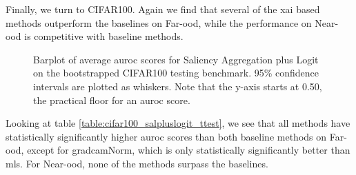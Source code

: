 \documentclass[UKenglish]{uiomasterthesis} %
\theoremstyle{definition}
\begin{document}
Finally, we turn to CIFAR100. Again we find that several of the \ac{xai} based methods outperform the baselines on Far-\ac{ood}, while the performance on Near-\ac{ood} is competitive with baseline methods.

\begin{figure}[H]
    \begin{center}
        
    \end{center}
    \caption[CIFAR100 Saliency Aggregation plus Logit Bootstrap]{Barplot of average \ac{auroc} scores for Saliency Aggregation plus Logit on the bootstrapped CIFAR100 testing benchmark. 95\% confidence intervals are plotted as whiskers. Note that the y-axis starts at 0.50, the practical floor for an \ac{auroc} score.}
    \label{fig:cifar100_salpluslogit_bootstrap_barplot}
\end{figure}

Looking at table \ref{table:cifar100_salpluslogit_ttest}, we see that all methods have statistically significantly higher \ac{auroc} scores than both baseline methods on Far-\ac{ood}, except for \ac{gradcam}Norm, which is only statistically significantly better than \ac{mls}. For Near-\ac{ood}, none of the methods surpass the baselines.
\end{document}

